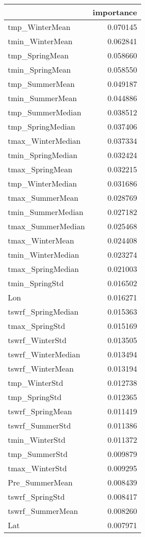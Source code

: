 \begin{tabular}{lr}
\toprule
 & importance \\
\midrule
tmp_WinterMean & 0.070145 \\
tmin_WinterMean & 0.062841 \\
tmp_SpringMean & 0.058660 \\
tmin_SpringMean & 0.058550 \\
tmp_SummerMean & 0.049187 \\
tmin_SummerMean & 0.044886 \\
tmp_SummerMedian & 0.038512 \\
tmp_SpringMedian & 0.037406 \\
tmax_WinterMedian & 0.037334 \\
tmin_SpringMedian & 0.032424 \\
tmax_SpringMean & 0.032215 \\
tmp_WinterMedian & 0.031686 \\
tmax_SummerMean & 0.028769 \\
tmin_SummerMedian & 0.027182 \\
tmax_SummerMedian & 0.025468 \\
tmax_WinterMean & 0.024408 \\
tmin_WinterMedian & 0.023274 \\
tmax_SpringMedian & 0.021003 \\
tmin_SpringStd & 0.016502 \\
Lon & 0.016271 \\
tswrf_SpringMedian & 0.015363 \\
tmax_SpringStd & 0.015169 \\
tswrf_WinterStd & 0.013505 \\
tswrf_WinterMedian & 0.013494 \\
tswrf_WinterMean & 0.013194 \\
tmp_WinterStd & 0.012738 \\
tmp_SpringStd & 0.012365 \\
tswrf_SpringMean & 0.011419 \\
tswrf_SummerStd & 0.011386 \\
tmin_WinterStd & 0.011372 \\
tmp_SummerStd & 0.009879 \\
tmax_WinterStd & 0.009295 \\
Pre_SummerMean & 0.008439 \\
tswrf_SpringStd & 0.008417 \\
tswrf_SummerMean & 0.008260 \\
Lat & 0.007971 \\

\end{tabular}
